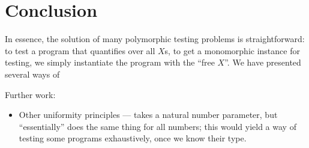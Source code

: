 \documentclass{llncs}
\begin{document}
\section{Conclusion}

In essence, the solution of many polymorphic testing problems is
straightforward: to test a program that quantifies over all $X$s, to
get a monomorphic instance for testing, we simply instantiate the
program with the ``free $X$''. We have presented several ways of 

Further work:
\begin{itemize}
\item Other uniformity principles --- takes a natural number
  parameter, but ``essentially'' does the same thing for all numbers;
  this would yield a way of testing some programs exhaustively, once
  we know their type.
\end{itemize}

 
\end{document}
